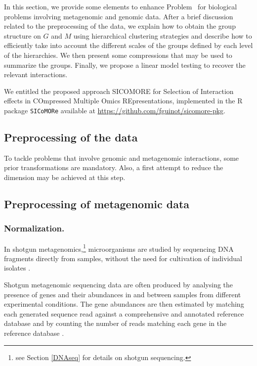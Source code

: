 \documentclass[]{book}
\begin{document}
In this section, we provide some elements to enhance Problem~ for
biological problems involving metagenomic and genomic data. After a
brief discussion related to the preprocessing of the data, we explain
how to obtain the group structure on \(\mathit{G}\) and \(\mathit{M}\) using hierarchical
clustering strategies and describe how to efficiently take into account
the different scales of the groups defined by each level of the
hierarchies. We then present some compressions that may be used to
summarize the groups. Finally, we propose a linear model testing to
recover the relevant interactions.

We entitled the proposed approach SICOMORE for Selection of Interaction
effects in COmpressed Multiple Omics REpresentations, implemented in the
R package \texttt{SICoMORe} available at \url{https://github.com/fguinot/sicomore-pkg}.

\hypertarget{preprocess}{%
\subsection{Preprocessing of the data}\label{preprocess}}

To tackle problems that involve genomic and metagenomic interactions,
some prior transformations are mandatory. Also, a first attempt to
reduce the dimension may be achieved at this step.

\hypertarget{preprocessing-of-metagenomic-data}{%
\subsection{Preprocessing of metagenomic data}\label{preprocessing-of-metagenomic-data}}

\hypertarget{normalization.}{%
\subsubsection{Normalization.}\label{normalization.}}

In shotgun metagenomics,\footnote{see Section \ref{DNAseq} for details on shotgun sequencing.} microorganisms are studied by sequencing
DNA fragments directly from samples, without the need for cultivation of
individual isolates \citep{sharpton2014introduction}.

Shotgun metagenomic sequencing data are often produced by analysing the
presence of genes and their abundances in and between samples from
different experimental conditions. The gene abundances are then
estimated by matching each generated sequence read against a
comprehensive and annotated reference database and by counting the
number of reads matching each gene in the reference database
\citep{pereira2018comparison}.
\end{document}
